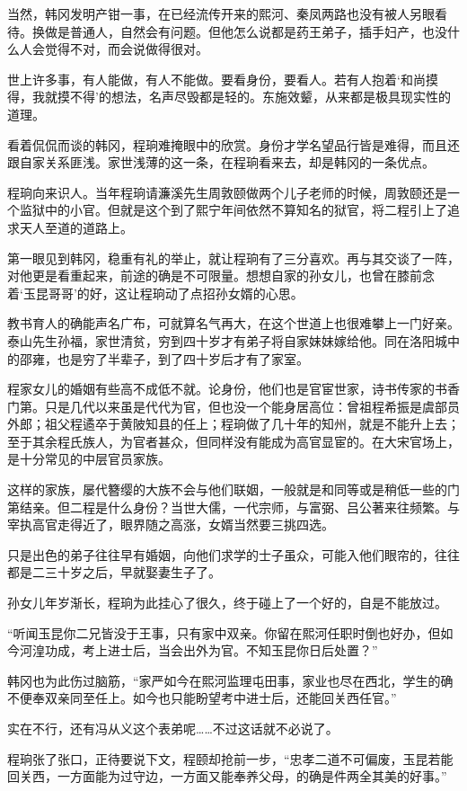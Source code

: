 当然，韩冈发明产钳一事，在已经流传开来的熙河、秦凤两路也没有被人另眼看待。换做是普通人，自然会有问题。但他怎么说都是药王弟子，插手妇产，也没什么人会觉得不对，而会说做得很对。

世上许多事，有人能做，有人不能做。要看身份，要看人。若有人抱着‘和尚摸得，我就摸不得’的想法，名声尽毁都是轻的。东施效颦，从来都是极具现实性的道理。

看着侃侃而谈的韩冈，程珦难掩眼中的欣赏。身份才学名望品行皆是难得，而且还跟自家关系匪浅。家世浅薄的这一条，在程珦看来去，却是韩冈的一条优点。

程珦向来识人。当年程珦请濂溪先生周敦颐做两个儿子老师的时候，周敦颐还是一个监狱中的小官。但就是这个到了熙宁年间依然不算知名的狱官，将二程引上了追求天人至道的道路上。

第一眼见到韩冈，稳重有礼的举止，就让程珦有了三分喜欢。再与其交谈了一阵，对他更是看重起来，前途的确是不可限量。想想自家的孙女儿，也曾在膝前念着‘玉昆哥哥’的好，这让程珦动了点招孙女婿的心思。

教书育人的确能声名广布，可就算名气再大，在这个世道上也很难攀上一门好亲。泰山先生孙福，家世清贫，穷到四十岁才有弟子将自家妹妹嫁给他。同在洛阳城中的邵雍，也是穷了半辈子，到了四十岁后才有了家室。

程家女儿的婚姻有些高不成低不就。论身份，他们也是官宦世家，诗书传家的书香门第。只是几代以来虽是代代为官，但也没一个能身居高位：曾祖程希振是虞部员外郎；祖父程遹卒于黄陂知县的任上；程珦做了几十年的知州，就是不能升上去；至于其余程氏族人，为官者甚众，但同样没有能成为高官显宦的。在大宋官场上，是十分常见的中层官员家族。

这样的家族，屡代簪缨的大族不会与他们联姻，一般就是和同等或是稍低一些的门第结亲。但二程是什么身份？当世大儒，一代宗师，与富弼、吕公著来往频繁。与宰执高官走得近了，眼界随之高涨，女婿当然要三挑四选。

只是出色的弟子往往早有婚姻，向他们求学的士子虽众，可能入他们眼帘的，往往都是二三十岁之后，早就娶妻生子了。

孙女儿年岁渐长，程珦为此挂心了很久，终于碰上了一个好的，自是不能放过。

“听闻玉昆你二兄皆没于王事，只有家中双亲。你留在熙河任职时倒也好办，但如今河湟功成，考上进士后，当会出外为官。不知玉昆你日后处置？”

韩冈也为此伤过脑筋，“家严如今在熙河监理屯田事，家业也尽在西北，学生的确不便奉双亲同至任上。如今也只能盼望考中进士后，还能回关西任官。”

实在不行，还有冯从义这个表弟呢……不过这话就不必说了。

程珦张了张口，正待要说下文，程颐却抢前一步，“忠孝二道不可偏废，玉昆若能回关西，一方面能为过守边，一方面又能奉养父母，的确是件两全其美的好事。”

